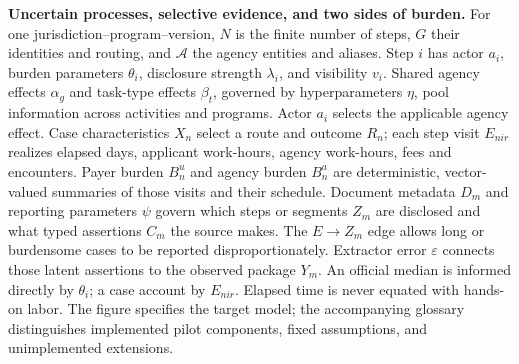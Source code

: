 \caption{\textbf{Uncertain processes, selective evidence, and two sides of burden.}
For one jurisdiction--program--version, $N$ is the finite number of steps,
$G$ their identities and routing, and $\mathcal A$ the agency entities and aliases.
Step $i$ has actor $a_i$, burden parameters $\theta_i$, disclosure strength
$\lambda_i$, and visibility $v_i$. Shared agency effects $\alpha_g$ and task-type
effects $\beta_t$, governed by hyperparameters $\eta$, pool information across
activities and programs. Actor $a_i$ selects the applicable agency effect.
Case characteristics $X_n$ select a route and outcome $R_n$; each step visit
$E_{nir}$ realizes elapsed days, applicant work-hours, agency work-hours, fees and
encounters. Payer burden $B_n^u$ and agency burden $B_n^a$ are deterministic,
vector-valued summaries of those visits and their schedule. Document metadata
$D_m$ and reporting parameters $\psi$ govern which steps or segments $Z_m$ are
disclosed and what typed assertions $C_m$ the source makes. The $E\to Z_m$ edge
allows long or burdensome cases to be reported disproportionately. Extractor error
$\varepsilon$ connects those latent assertions to the observed package $Y_m$.
An official median is informed directly by $\theta_i$; a case account by
$E_{nir}$. Elapsed time is never equated with hands-on labor. The figure specifies
the target model; the accompanying glossary distinguishes implemented pilot
components, fixed assumptions, and unimplemented extensions.}
\label{fig:plate-simplified}
